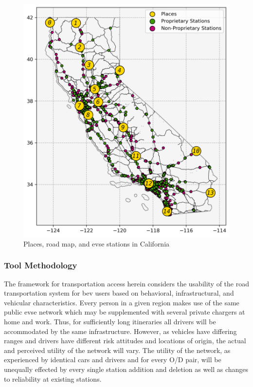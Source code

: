 \documentclass[12pt]{article}
\begin{document}
\begin{figure}[H]
	\centering
	\includegraphics[width = \linewidth]{figs/California_Places_Chargers.png}
	\caption{Places, road map, and \gls{evse} stations in California}
	\label{fig:atlas}
\end{figure}

\subsubsection*{Tool Methodology}

The framework for transportation access herein considers the usability of the road transportation system for \gls{bev} users based on behavioral, infrastructural, and vehicular characteristics. Every person in a given region makes use of the same public \gls{evse} network which may be supplemented with several private chargers at home and work. Thus, for sufficiently long itineraries all drivers will be accommodated by the same infrastructure. However, as vehicles have differing ranges and drivers have different risk attitudes and locations of origin, the actual and perceived utility of the network will vary. The utility of the network, as experienced by identical cars and drivers and for every O/D pair, will be unequally effected by every single station addition and deletion as well as changes to reliability at existing stations.
\end{document}
